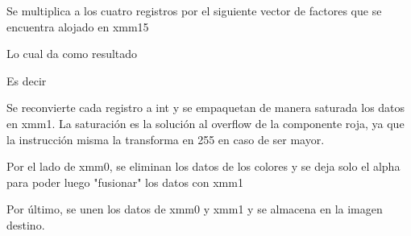  

 

 

 

Se multiplica a los cuatro registros por el siguiente vector de factores que se encuentra alojado en xmm15

 

Lo cual da como resultado

 

 

 

 

Es decir

 

 

 

 

Se reconvierte cada registro a int y se empaquetan de manera saturada los datos en xmm1. La saturación es la solución al overflow de la componente roja, ya que la instrucción misma la transforma en 255 en caso de ser mayor.

 

Por el lado de xmm0, se eliminan los datos de los colores y se deja solo el alpha para poder luego "fusionar" los datos con xmm1

 

Por último, se unen los datos de xmm0 y xmm1 y se almacena en la imagen destino.

 

